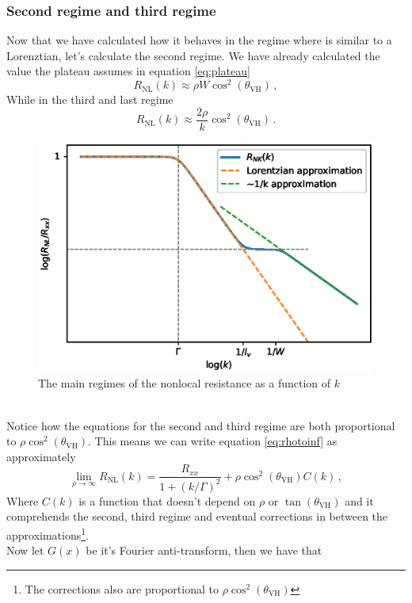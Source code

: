 \subsubsection*{Second regime and third regime}
Now that we have calculated how it behaves in the regime where is similar to a Lorenztian, let's calculate the second regime. We have already calculated the value the plateau assumes in equation \ref{eq:plateau} 
\begin{equation}
    R_{\textrm{NL}}(k)\approx \rho W\cos^2(\theta_{\textrm{VH}})\,,
    \label{eq:second_regime}
\end{equation}
While in the third and last regime 
\begin{equation}
    R_{\textrm{NL}}(k)\approx \frac{2\rho}k \cos^2(\theta_{\textrm{VH}})\,.
    \label{eq:third_regime}
\end{equation}
\begin{figure}[h!]
    \centering
    \includegraphics[width=\linewidth]{Immagini/rnl/rho3.eps }
    \caption{The main regimes of the nonlocal resistance as a function of $k$}
    \label{fig:rho3}
\end{figure}\\
Notice how the equations for the second and third regime are both proportional to $\rho\cos^2(\theta_{\textrm{VH}})$. This means we can write equation \ref{eq:rhotoinf} as approximately
\begin{equation}
    \lim_{\rho\to\infty} R_{\textrm{NL}}(k)=\frac{R_{xx}}{1+(k/\Gamma)^2} + \rho\cos^2(\theta_{\textrm{VH}}) C(k)\,,
    \label{eq:rhotoinf2}
\end{equation}
Where $C(k)$ is a function that doesn't depend on $\rho$ or $\tan(\theta_{\textrm{VH}})$ and it comprehends the second, third regime and eventual corrections in between the approximations\footnote{The corrections also are proportional to $\rho\cos^2(\theta_{\textrm{VH}})$}.\\%
Now let $G(x)$ be it's Fourier anti-transform, then we have that 

